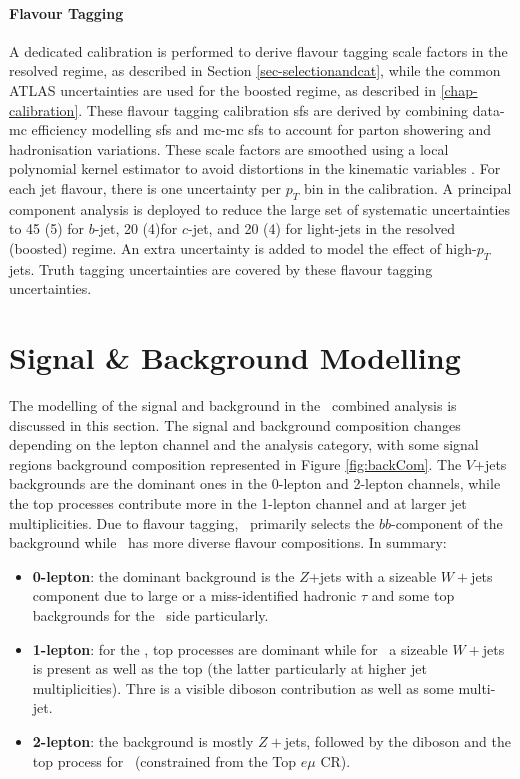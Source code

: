 \paragraph{Flavour Tagging} A dedicated calibration is performed to derive flavour tagging scale factors in the resolved regime, as described in Section \ref{sec-selectionandcat}, while the common ATLAS uncertainties are used for the boosted regime, as described in \ref{chap-calibration}. These flavour tagging calibration \gls{sf}s are derived by combining data-\gls{mc} efficiency modelling \gls{sf}s and \gls{mc}-\gls{mc} \gls{sf}s to account for parton showering and hadronisation variations. These scale factors are smoothed using a local polynomial kernel estimator to avoid distortions in the kinematic variables \cite{ATL-PHYS-PUB-2020-004}. For each jet flavour, there is one uncertainty per $p_T$ bin in the calibration. A principal component analysis is deployed to reduce the large set of systematic uncertainties to 45 (5) for $b$-jet, 20 (4)for $c$-jet, and 20 (4) for light-jets in the resolved (boosted) regime. An extra uncertainty is added to model the effect of high-$p_T$ jets. Truth tagging uncertainties are covered by these flavour tagging uncertainties.

%
\section{Signal \& Background Modelling}\label{sec-mod}
The modelling of the signal and background in the \vhbc\ combined analysis is discussed in this section. The signal and background composition changes depending on the lepton channel and the analysis category, with some signal regions background composition represented in Figure \ref{fig:backCom}. The $V$+jets backgrounds are the dominant ones in the 0-lepton and 2-lepton channels, while the top processes contribute more in the 1-lepton channel and at larger jet multiplicities. Due to flavour tagging, \vhb\ primarily selects the $bb$-component of the background while \vhc\ has more diverse flavour compositions. In summary:
\begin{itemize}
    \item \textbf{0-lepton}: the dominant background is the $Z$+jets with a sizeable $W+$jets component due to large \etm or a miss-identified hadronic $\tau$ and some top backgrounds for the \vhb\ side particularly.
    \item \textbf{1-lepton}: for the \vhb, top processes are dominant while for \vhc\ a sizeable $W+$jets is present as well as the top (the latter particularly at higher jet multiplicities). Thre is a visible diboson contribution as well as some multi-jet.  
    \item \textbf{2-lepton}: the background is mostly $Z+$jets, followed by the diboson and the top process for \vhb\ (constrained from the Top $e\mu$ CR). 
\end{itemize}

